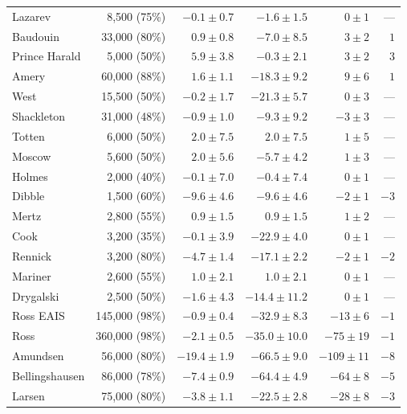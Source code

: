 \begin{footnotesize}
\begin{longtable}{lrrrrr}
Lazarev 	& 8,500     (75\%) & $-0.1  \pm 0.7$ & $-1.6  \pm 1.5 $ & $0    \pm 1 $ &  ---   \\
Baudouin 	& 33,000    (80\%) & $0.9   \pm 0.8$ & $-7.0  \pm 8.5 $ & $3    \pm 2 $ & $1   $ \\
Prince Harald 	& 5,000     (50\%) & $5.9   \pm 3.8$ & $-0.3  \pm 2.1 $ & $3    \pm 2 $ & $3   $ \\
Amery 	        & 60,000    (88\%) & $1.6   \pm 1.1$ & $-18.3 \pm 9.2 $ & $9    \pm 6 $ & $1   $ \\
West 	        & 15,500    (50\%) & $-0.2  \pm 1.7$ & $-21.3 \pm 5.7 $ & $0    \pm 3 $ &  ---   \\
Shackleton 	& 31,000    (48\%) & $-0.9  \pm 1.0$ & $-9.3  \pm 9.2 $ & $-3   \pm 3 $ &  ---   \\
Totten  	& 6,000     (50\%) & $2.0   \pm 7.5$ & $2.0   \pm 7.5 $ & $1    \pm 5 $ &  ---   \\
Moscow  	& 5,600     (50\%) & $2.0   \pm 5.6$ & $-5.7  \pm 4.2 $ & $1    \pm 3 $ &  ---   \\
Holmes  	& 2,000     (40\%) & $-0.1  \pm 7.0$ & $-0.4  \pm 7.4 $ & $0    \pm 1 $ &  ---   \\
Dibble  	& 1,500     (60\%) & $-9.6  \pm 4.6$ & $-9.6  \pm 4.6 $ & $-2   \pm 1 $ & $-3  $ \\
Mertz 	        & 2,800     (55\%) & $0.9   \pm 1.5$ & $0.9   \pm 1.5 $ & $1    \pm 2 $ &  ---   \\
Cook 	        & 3,200     (35\%) & $-0.1  \pm 3.9$ & $-22.9 \pm 4.0 $ & $0    \pm 1 $ &  ---   \\
Rennick 	& 3,200     (80\%) & $-4.7  \pm 1.4$ & $-17.1 \pm 2.2 $ & $-2   \pm 1 $ & $-2  $ \\
Mariner 	& 2,600     (55\%) & $1.0   \pm 2.1$ & $1.0   \pm 2.1 $ & $0    \pm 1 $ &  ---   \\
Drygalski 	& 2,500     (50\%) & $-1.6  \pm 4.3$ & $-14.4 \pm 11.2$ & $0    \pm 1 $ &  ---   \\
Ross EAIS 	& 145,000   (98\%) & $-0.9  \pm 0.4$ & $-32.9 \pm 8.3 $ & $-13  \pm 6 $ & $-1  $ \\
Ross	        & 360,000   (98\%) & $-2.1  \pm 0.5$ & $-35.0 \pm 10.0$ & $-75  \pm 19$ & $-1  $ \\
Amundsen 	& 56,000    (80\%) & $-19.4 \pm 1.9$ & $-66.5 \pm 9.0 $ & $-109 \pm 11$ & $-8  $ \\
Bellingshausen  & 86,000    (78\%) & $-7.4  \pm 0.9$ & $-64.4 \pm 4.9 $ & $-64  \pm 8 $ & $-5  $ \\
Larsen  	& 75,000    (80\%) & $-3.8  \pm 1.1$ & $-22.5 \pm 2.8 $ & $-28  \pm 8 $ & $-3  $ \\

\end{longtable}
\end{footnotesize}

